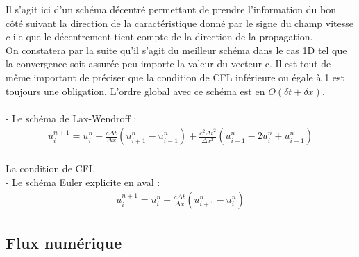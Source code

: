 \documentclass[12pt]{article}
\begin{document}
\noindent Il s'agit ici d'un schéma décentré permettant de prendre l'information du bon côté suivant la direction de la caractéristique donné par le signe du champ vitesse $c$ i.e que le décentrement tient compte de la direction de la propagation.
\\On constatera par la suite qu'il s'agit du meilleur schéma dans le cas 1D tel que la convergence soit assurée peu importe la valeur du vecteur c. Il est tout de même important de préciser que la condition de CFL inférieure ou égale à 1 est toujours une obligation.
L'ordre global avec ce schéma est en $O(\delta t + \delta x)$.
\\
\\- Le schéma de Lax-Wendroff :
\\
\begin{eqnarray*}
        u^{n+1}_i=u_i^n-\frac{c\Delta t}{\Delta x}({u_{i+1}^n-u_{i-1}^n}) +\frac{c^2\Delta t^2}{\Delta x^2}(u_{i+1}^n-2u_{i}^n+u^{n}_{i-1})
\end{eqnarray*}
\\
La condition de CFL 
\\- Le schéma Euler explicite en aval :
\\
\begin{eqnarray*}
        u^{n+1}_i=u_i^n-\frac{c\Delta t}{\Delta x}({u_{i+1}^n-u_{i}^n})
\end{eqnarray*}

\newpage
\subsection{Flux numérique}
\end{document}

